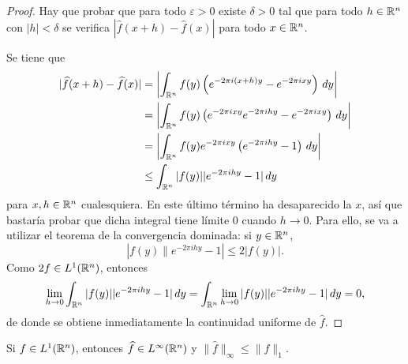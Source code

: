 \documentclass[a4paper, 11pt, oneside]{report}
\begin{document}
\begin{proof}
  Hay que probar que para todo $\varepsilon > 0$ existe $\delta > 0$ tal que para todo $h \in \mathbb R^n$ con $|h|<\delta$ se verifica $|\widehat{f}(x+h)-\widehat{f}(x)|$ para todo $x \in \mathbb R^n$. 
  
  Se tiene que
  \[\begin{aligned}[t]
    |\widehat{f}(x+h)-\widehat{f}(x)| &= \left|\int_{\mathbb R^n}f(y)\left(e^{-2\pi i (x+h)y}-e^{-2\pi i xy}\right) \, dy\right| \\
    &= \left|\int_{\mathbb R^n}f(y)\left(e^{-2\pi ixy}e^{-2\pi i hy}-e^{-2\pi i xy}\right) \, dy\right| \\
    &= \left|\int_{\mathbb R^n}f(y)e^{-2\pi ixy}\left(e^{-2\pi i hy}-1\right) \, dy\right| \\
    &\leq \int_{\mathbb R^n} |f(y)| |e^{-2\pi i hy} - 1| \, dy
  \end{aligned}\]
  para $x, h \in \mathbb R^n$ cualesquiera. En este último término ha desaparecido la $x$, así que bastaría probar que dicha integral tiene límite $0$ cuando $h \to 0$. Para ello, se va a utilizar el teorema de la convergencia dominada: si $y \in \mathbb R^n$,
  \[|f(y)\|e^{-2\pi i hy} - 1| \leq 2|f(y)|.\]
  Como $2f \in L^1(\mathbb R^n)$, entonces
  \[\lim_{h \to 0}\int_{\mathbb R^n} |f(y)| |e^{-2\pi i hy} - 1| \, dy = \int_{\mathbb R^n}\lim_{h \to 0}|f(y)| |e^{-2\pi i hy} - 1| \, dy = 0, \]
  de donde se obtiene inmediatamente la continuidad uniforme de $\widehat{f}$.
\end{proof}

\begin{corollary}\label{cor:3.1.3}
  Si $f \in L^1(\mathbb R^n)$, entonces $\widehat{f} \in L^\infty(\mathbb R^n)$ y $\|\widehat{f}\|_\infty \leq \|f\|_1$.
\end{corollary}
\end{document}
